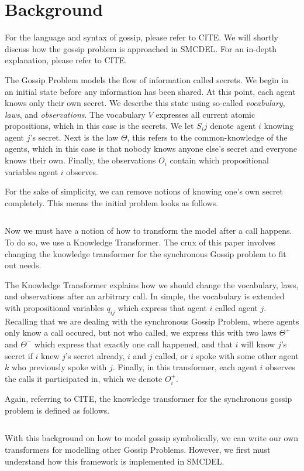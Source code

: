 \section{Background}

For the language and syntax of gossip, please refer to CITE. We will shortly discuss how the gossip problem is approached in SMCDEL. For an in-depth explanation, please refer to CITE.

The Gossip Problem models the flow of information called secrets. We begin in an initial state before any information has been shared. At this point, each agent knows only their own secret. We describe this state using so-called \textit{vocabulary}, \textit{laws}, and \textit{observations}. The vocabulary $V$ expresses all current atomic propositions, which in this case is the secrets. We let $S_ij$ denote agent $i$ knowing agent $j$'s secret. Next is the law $\Theta$, this refers to the common-knowledge of the agents, which in this case is that nobody knows anyone else's secret and everyone knows their own. Finally, the observations $O_i$ contain which propositional variables agent $i$ observes. 

For the sake of simplicity, we can remove notions of knowing one's own secret completely. This means the initial problem looks as follows. 

$$$$ 

Now we must have a notion of how to transform the model after a call happens. To do so, we use a Knowledge Transformer. The crux of this paper involves changing the knowledge transformer for the synchronous Gossip problem to fit out needs. 

The Knowledge Transformer explains how we should change the vocabulary, laws, and observations after an arbitrary call. In simple, the vocabulary is extended with propositional variables $q_{ij}$ which express that agent $i$ called agent $j$. Recalling that we are dealing with the synchronous Gossip Problem, where agents only know a call occured, but not who called, we express this with two laws $\Theta^+$ and $\Theta^-$ which express that exactly one call happened, and that $i$ will know $j$'s secret if $i$ knew $j$'s secret already, $i$ and $j$ called, or $i$ spoke with some other agent $k$ who previously spoke with $j$. Finally, in this transformer, each agent $i$ observes the calls it participated in, which we denote $O^+_i$. 

Again, referring to CITE, the knowledge transformer for the synchronous gossip problem is defined as follows. 

$$$$

With this background on how to model gossip symbolically, we can write our own transformers for modelling other Gossip Problems. However, we first must understand how this framework is implemented in SMCDEL.
